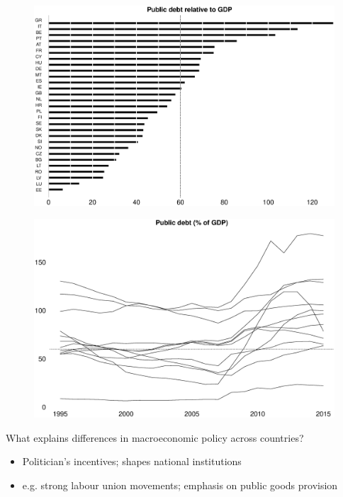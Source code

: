\documentclass{beamer}
\begin{document}
\begin{frame}
  \begin{figure}
    \includegraphics[scale=.3]{public_debt.eps}
  \end{figure}
\end{frame}

\begin{frame}
  \begin{figure}
    \includegraphics[scale=.3]{public_debt_eurozone.eps}
  \end{figure}
\end{frame}

\begin{frame}
  What explains differences in macroeconomic policy across countries?
  \begin{itemize}
    \item Politician's incentives; shapes national institutions
    \item e.g. strong labour union movements; emphasis on public goods provision
  \end{itemize}  
\end{frame}
\end{document}
